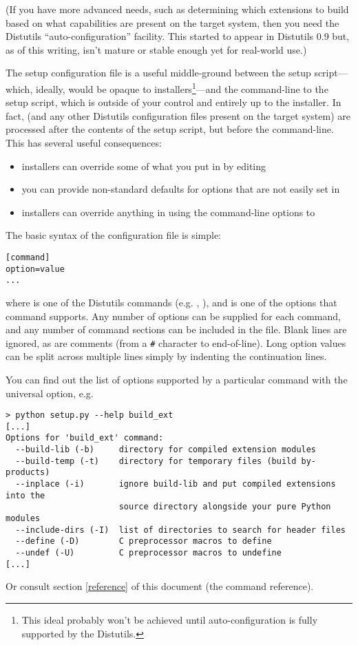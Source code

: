 \documentclass{howto}
\begin{document}
(If you have more advanced needs, such as determining which extensions
to build based on what capabilities are present on the target system,
then you need the Distutils ``auto-configuration'' facility.  This
started to appear in Distutils 0.9 but, as of this writing, isn't mature 
or stable enough yet for real-world use.)


The setup configuration file is a useful middle-ground between the setup
script---which, ideally, would be opaque to installers\footnote{This
  ideal probably won't be achieved until auto-configuration is fully
  supported by the Distutils.}---and the command-line to the setup
script, which is outside of your control and entirely up to the
installer.  In fact,  (and any other Distutils
configuration files present on the target system) are processed after
the contents of the setup script, but before the command-line.  This has 
several useful consequences:
\begin{itemize}
\item installers can override some of what you put in  by
  editing 
\item you can provide non-standard defaults for options that are not
  easily set in 
\item installers can override anything in  using the
  command-line options to 
\end{itemize}

The basic syntax of the configuration file is simple:
\begin{verbatim}
[command]
option=value
...
\end{verbatim}
where  is one of the Distutils commands (e.g.
, ), and  is one of the
options that command supports.  Any number of options can be supplied
for each command, and any number of command sections can be included in
the file.  Blank lines are ignored, as are comments (from a \verb+#+
character to end-of-line).  Long option values can be split across
multiple lines simply by indenting the continuation lines.

You can find out the list of options supported by a particular command
with the universal  option, e.g.
\begin{verbatim}
> python setup.py --help build_ext
[...]
Options for 'build_ext' command:
  --build-lib (-b)     directory for compiled extension modules
  --build-temp (-t)    directory for temporary files (build by-products)
  --inplace (-i)       ignore build-lib and put compiled extensions into the
                       source directory alongside your pure Python modules
  --include-dirs (-I)  list of directories to search for header files
  --define (-D)        C preprocessor macros to define
  --undef (-U)         C preprocessor macros to undefine
[...]
\end{verbatim}
Or consult section \ref{reference} of this document (the command
reference).
\end{document}
